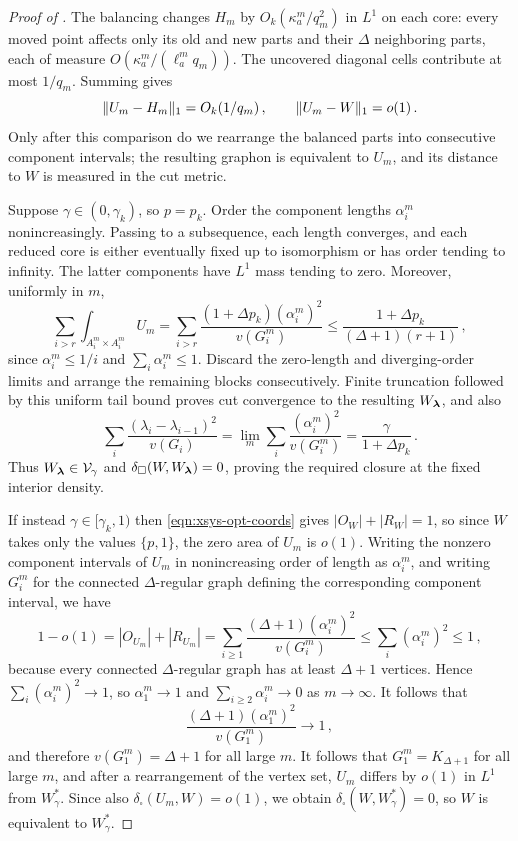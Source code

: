 \begin{proof}[Proof of ]
The balancing changes $H_m$ by $O_k(\kappa_a^m/q_m^2)$ in $L^1$ on each core: every moved point affects only its old and new parts and their $\Delta$ neighboring parts, each of measure $O(\kappa_a^m/(\ell_a^m q_m))$. The uncovered diagonal cells contribute at most $1/q_m$. Summing gives
$$\lVert U_m-H_m\rVert_1=O_k(1/q_m)\,,\qquad \lVert U_m-W\rVert_1=o(1)\,.$$
Only after this comparison do we rearrange the balanced parts into consecutive component intervals; the resulting graphon is equivalent to $U_m$, and its distance to $W$ is measured in the cut metric.

Suppose $\gamma\in(0,\gamma_k)$, so $p=p_k$. Order the component lengths $\alpha_i^m$ nonincreasingly. Passing to a subsequence, each length converges, and each reduced core is either eventually fixed up to isomorphism or has order tending to infinity. The latter components have $L^1$ mass tending to zero. Moreover, uniformly in $m$,
$$\sum_{i>r}\int_{A_i^m\times A_i^m}U_m=\sum_{i>r}\frac{(1+\Delta p_k)(\alpha_i^m)^2}{v(G_i^m)}\leq\frac{1+\Delta p_k}{(\Delta+1)(r+1)}\,,$$
since $\alpha_i^m\leq1/i$ and $\sum_i\alpha_i^m\leq1$. Discard the zero-length and diverging-order limits and arrange the remaining blocks consecutively. Finite truncation followed by this uniform tail bound proves cut convergence to the resulting $W_{\boldsymbol{\lambda}}$, and also
$$\sum_i\frac{(\lambda_i-\lambda_{i-1})^2}{v(G_i)}=\lim_m\sum_i\frac{(\alpha_i^m)^2}{v(G_i^m)}=\frac{\gamma}{1+\Delta p_k}\,.$$
Thus $W_{\boldsymbol{\lambda}}\in{\mathcal V}_\gamma$ and $\delta_\square(W,W_{\boldsymbol{\lambda}})=0$, proving the required closure at the fixed interior density.

If instead $\gamma\in[\gamma_k,1)$ then \eqref{eqn:xsys-opt-coords} gives $|O_W|+|R_W|=1$, so since $W$ takes only the values $\{p,1\}$, the zero area of $U_m$ is $o(1)$. Writing the nonzero component intervals of $U_m$ in nonincreasing order of length as $\alpha_i^m$, and writing $G_i^m$ for the connected $\Delta$-regular graph defining the corresponding component interval, we have
$$1-o(1)=|O_{U_m}|+|R_{U_m}|=\sum_{i\geq1}\frac{(\Delta+1)(\alpha_i^m)^2}{v(G_i^m)}\leq \sum_i(\alpha_i^m)^2\leq1\,,$$
because every connected $\Delta$-regular graph has at least $\Delta+1$ vertices. Hence $\sum_i(\alpha_i^m)^2\to1$, so $\alpha_1^m\to1$ and $\sum_{i\geq2}\alpha_i^m\to0$ as $m\to\infty$. It follows that
$$\frac{(\Delta+1)(\alpha_1^m)^2}{v(G_1^m)}\to1\,,$$
and therefore $v(G_1^m)=\Delta+1$ for all large $m$. It follows that $G_1^m=K_{\Delta+1}$ for all large $m$, and after a rearrangement of the vertex set, $U_m$ differs by $o(1)$ in $L^1$ from $W^\ast_\gamma$. Since also $\delta_\square(U_m,W)=o(1)$, we obtain $\delta_\square(W,W^\ast_\gamma)=0$, so $W$ is equivalent to $W^\ast_\gamma$.
\end{proof}

